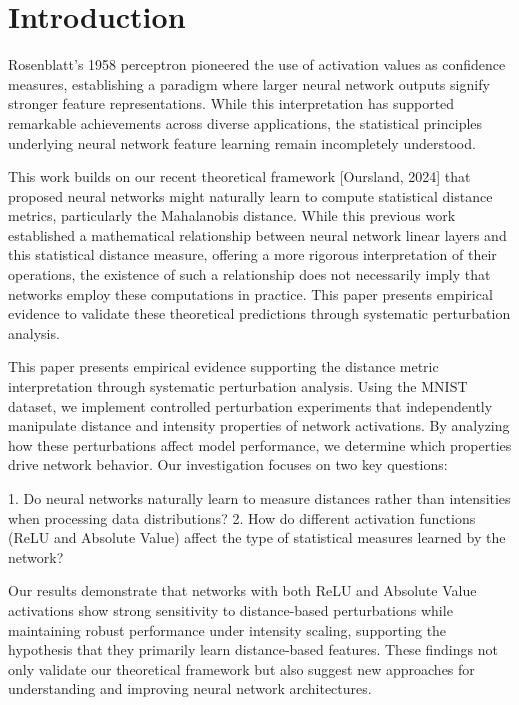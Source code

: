 \section{Introduction}

Rosenblatt's 1958 perceptron pioneered the use of activation values as confidence measures, establishing a paradigm where larger neural network outputs signify stronger feature representations. While this interpretation has supported remarkable achievements across diverse applications, the statistical principles underlying neural network feature learning remain incompletely understood.

This work builds on our recent theoretical framework [Oursland, 2024] that proposed neural networks might naturally learn to compute statistical distance metrics, particularly the Mahalanobis distance. While this previous work established a mathematical relationship between neural network linear layers and this statistical distance measure, offering a more rigorous interpretation of their operations, the existence of such a relationship does not necessarily imply that networks employ these computations in practice. This paper presents empirical evidence to validate these theoretical predictions through systematic perturbation analysis.

This paper presents empirical evidence supporting the distance metric interpretation through systematic perturbation analysis. Using the MNIST dataset, we implement controlled perturbation experiments that independently manipulate distance and intensity properties of network activations. By analyzing how these perturbations affect model performance, we determine which properties drive network behavior. Our investigation focuses on two key questions:

1. Do neural networks naturally learn to measure distances rather than intensities when processing data distributions?
2. How do different activation functions (ReLU and Absolute Value) affect the type of statistical measures learned by the network?

Our results demonstrate that networks with both ReLU and Absolute Value activations show strong sensitivity to distance-based perturbations while maintaining robust performance under intensity scaling, supporting the hypothesis that they primarily learn distance-based features. These findings not only validate our theoretical framework but also suggest new approaches for understanding and improving neural network architectures.